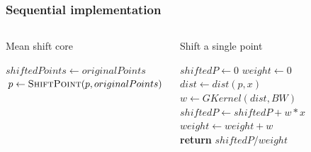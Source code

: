 \documentclass[xcolor=table]{beamer}
\begin{document}
\begin{frame}
\frametitle{Sequential implementation}
\begin{columns}[c]


\begin{algorithm}[H]
\tiny
\caption{Mean shift core}
\label{MeanShiftAlgSeq}
\begin{algorithmic}
	\State$shiftedPoints \gets originalPoints$
               \State $p\gets \Call{ShiftPoint}{p, originalPoints}$
            \EndFor
    \EndWhile
\EndFunction
\end{algorithmic}
\end{algorithm}

\begin{algorithm}[H]
\tiny
\caption{Shift a single point}
\label{ShiftPointAlgSeq}
\begin{algorithmic}
	\State $shiftedP\gets0$
	\State $weight\gets0$
    		\State$dist \gets dist(p, x)$
    		\State $w \gets GKernel(dist, BW)$
    		\State $shiftedP \gets shiftedP + w*x$
    		\State $weight \gets weight + w$
    \EndFor
    \State \textbf{return} $shiftedP/weight$
\EndFunction

\end{algorithmic}
\end{algorithm}

\vspace{-0.55cm}
\begin{figure}
\includegraphics[width=0.92\textwidth]{img/example_not_clustered}
\end{figure}


\end{columns}
\end{frame}
\end{document}
